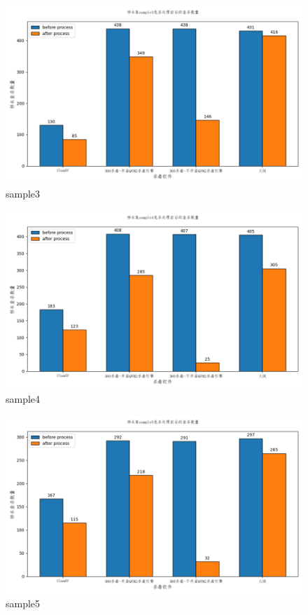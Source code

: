 \begin{figure}
  \centering
  \includegraphics[]{images/sample3.png}
  \caption{sample3}\label{fig:sample3}
\end{figure}

\begin{figure}
  \centering
  \includegraphics[]{images/sample4.png}
  \caption{sample4}\label{fig:sample4}
\end{figure}

\begin{figure}
  \centering
  \includegraphics[]{images/sample5.png}
  \caption{sample5}\label{fig:sample5}
\end{figure}

